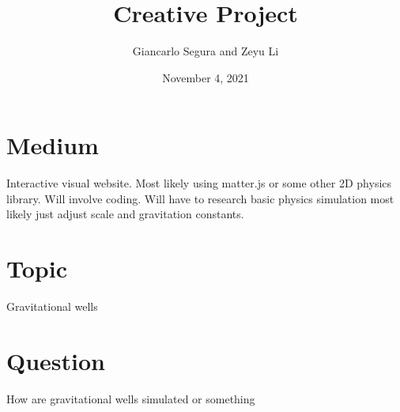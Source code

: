\documentclass{article}
\begin{document}
\title{Creative Project}
\author{Giancarlo Segura and Zeyu Li}
\date{November 4, 2021}

\maketitle

\section{Medium}

Interactive visual website. Most likely using matter.js or some other 2D physics library. Will involve coding. Will have to research basic physics simulation most likely just adjust scale and gravitation constants. 

\section{Topic}

Gravitational wells

\section{Question}

How are gravitational wells simulated or something 
\end{document}
